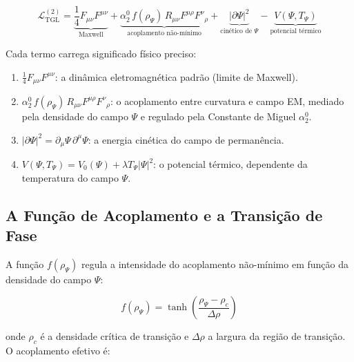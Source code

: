 \documentclass[12pt,a4paper,twoside]{article}
\newcommand{\Psifield}{\Psi}
\begin{document}
\begin{equationbox}[title={Lagrangiana com Acoplamento $\Psifield$ / $\Psifield$-Coupled Lagrangian}]
\begin{equation}
\boxed{\mathcal{L}_{\text{TGL}}^{(2)} = \underbrace{\frac{1}{4}F_{\mu\nu}F^{\mu\nu}}_{\text{Maxwell}} + \underbrace{\alpha_2^{0}\, f(\rho_\Psifield)\, R_{\mu\nu}F^{\mu\rho}F^{\nu}{}_{\rho}}_{\text{acoplamento n\~ao-m\'inimo}} + \underbrace{|\partial\Psifield|^2}_{\text{cin\'etico de }\Psifield} - \underbrace{V(\Psifield, T_\Psifield)}_{\text{potencial t\'ermico}}}
\label{eq:lagrangian_psi}
\end{equation}
\end{equationbox}

Cada termo carrega significado f\'isico preciso:
\begin{enumerate}[nosep]
\item $\frac{1}{4}F_{\mu\nu}F^{\mu\nu}$: a din\^amica eletromagn\'etica padr\~ao (limite de Maxwell).
\item $\alpha_2^{0}\, f(\rho_\Psifield)\, R_{\mu\nu}F^{\mu\rho}F^{\nu}{}_{\rho}$: o acoplamento entre curvatura e campo EM, mediado pela densidade do campo $\Psifield$ e regulado pela Constante de Miguel $\alpha_2^0$.
\item $|\partial\Psifield|^2 = \partial_\mu\Psifield\,\partial^\mu\Psifield$: a energia cin\'etica do campo de perman\^encia.
\item $V(\Psifield, T_\Psifield) = V_0(\Psifield) + \lambda T_\Psifield |\Psifield|^2$: o potencial t\'ermico, dependente da temperatura do campo $\Psifield$.
\end{enumerate}

\subsection{A Fun\c{c}\~ao de Acoplamento e a Transi\c{c}\~ao de Fase}

A fun\c{c}\~ao $f(\rho_\Psifield)$ regula a intensidade do acoplamento n\~ao-m\'inimo em fun\c{c}\~ao da densidade do campo $\Psifield$:

\begin{equation}
f(\rho_\Psifield) = \tanh\!\left(\frac{\rho_\Psifield - \rho_c}{\Delta\rho}\right)
\label{eq:coupling_function}
\end{equation}

\noindent onde $\rho_c$ \'e a densidade cr\'itica de transi\c{c}\~ao e $\Delta\rho$ a largura da regi\~ao de transi\c{c}\~ao. O acoplamento efetivo \'e:
\end{document}
